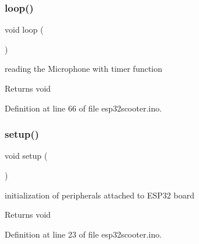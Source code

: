 \subsubsection{\texorpdfstring{loop()}{loop()}}
{\footnotesize\ttfamily void loop (\begin{DoxyParamCaption}{ }\end{DoxyParamCaption})}



reading the Microphone with timer function 

\begin{DoxyReturn}{Returns}
void 
\end{DoxyReturn}


Definition at line 66 of file esp32scooter.\+ino.

\mbox{\label{esp32scooter_8ino_a4fc01d736fe50cf5b977f755b675f11d}} 
\subsubsection{\texorpdfstring{setup()}{setup()}}
{\footnotesize\ttfamily void setup (\begin{DoxyParamCaption}{ }\end{DoxyParamCaption})}



initialization of peripherals attached to E\+S\+P32 board 

\begin{DoxyReturn}{Returns}
void 
\end{DoxyReturn}


Definition at line 23 of file esp32scooter.\+ino.


